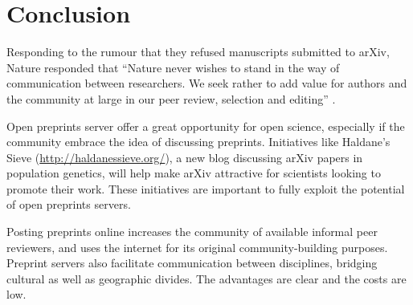 \documentclass[letterpaper,twocolumn,superscriptaddress,showkeys]{revtex4}
\begin{document}
\section{Conclusion}

Responding to the rumour that they refused manuscripts submitted to arXiv,
Nature responded that ``Nature never wishes to stand in the way of communication
between researchers. We seek rather to add value for authors and the community
at large in our peer review, selection and editing'' \cite{nat05}.

Open preprints server offer a great opportunity for open science, especially if
the community embrace the idea of discussing preprints. Initiatives like
Haldane's Sieve (\href{http://haldanessieve.org/}{http://haldanessieve.org/}), a
new blog discussing arXiv papers in population genetics, will help make arXiv
attractive for scientists looking to promote their work. These initiatives are
important to fully exploit the potential of open preprints servers.

Posting preprints online increases the community of available informal peer
reviewers, and uses the internet for its original community-building purposes.
Preprint servers also facilitate communication between disciplines, bridging
cultural as well as geographic divides. The advantages are clear and the costs are low.


\newpage


\end{document}
